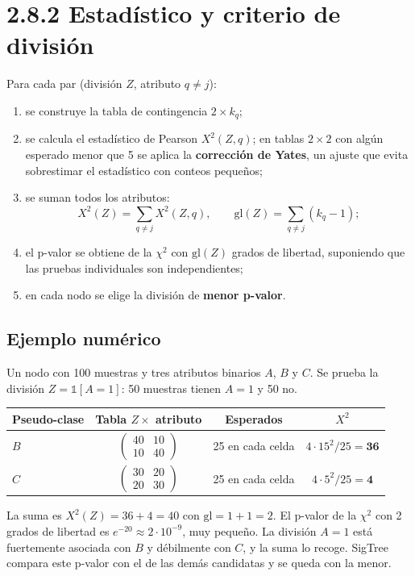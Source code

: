\documentclass[11pt,a4paper]{article}
\begin{document}
\section{2.8.2 Estadístico y criterio de división}

Para cada par (división $Z$, atributo $q\ne j$):
\begin{enumerate}
  \item se construye la tabla de contingencia $2\times k_q$;
  \item se calcula el estadístico de Pearson $X^2(Z,q)$; en tablas $2\times2$ con
  algún esperado menor que 5 se aplica la \textbf{corrección de Yates}, un ajuste
  que evita sobrestimar el estadístico con conteos pequeños;
  \item se suman todos los atributos:
  \[
    X^2(Z)=\sum_{q\ne j}X^2(Z,q),\qquad \mathrm{gl}(Z)=\sum_{q\ne j}(k_q-1);
  \]
  \item el p-valor se obtiene de la $\chi^2$ con $\mathrm{gl}(Z)$ grados de
  libertad, suponiendo que las pruebas individuales son independientes;
  \item en cada nodo se elige la división de \textbf{menor p-valor}.
\end{enumerate}

\subsection{Ejemplo numérico}

Un nodo con 100 muestras y tres atributos binarios $A$, $B$ y $C$. Se prueba la
división $Z=\mathbb 1[A=1]$: 50 muestras tienen $A=1$ y 50 no.
\begin{center}
\renewcommand{\arraystretch}{1.3}
\begin{tabular}{@{}lccc@{}}
\toprule
Pseudo-clase & Tabla $Z\times$ atributo & Esperados & $X^2$ \\
\midrule
$B$ & $\begin{pmatrix}40&10\\10&40\end{pmatrix}$ & 25 en cada celda & $4\cdot15^2/25=\mathbf{36}$ \\
\midrule
$C$ & $\begin{pmatrix}30&20\\20&30\end{pmatrix}$ & 25 en cada celda & $4\cdot5^2/25=\mathbf{4}$ \\
\bottomrule
\end{tabular}
\end{center}
La suma es $X^2(Z)=36+4=40$ con $\mathrm{gl}=1+1=2$. El p-valor de la $\chi^2$ con 2
grados de libertad es $e^{-20}\approx2\cdot10^{-9}$, muy pequeño. La división
$A=1$ está fuertemente asociada con $B$ y débilmente con $C$, y la suma lo recoge.
SigTree compara este p-valor con el de las demás candidatas y se queda con la menor.
\end{document}
